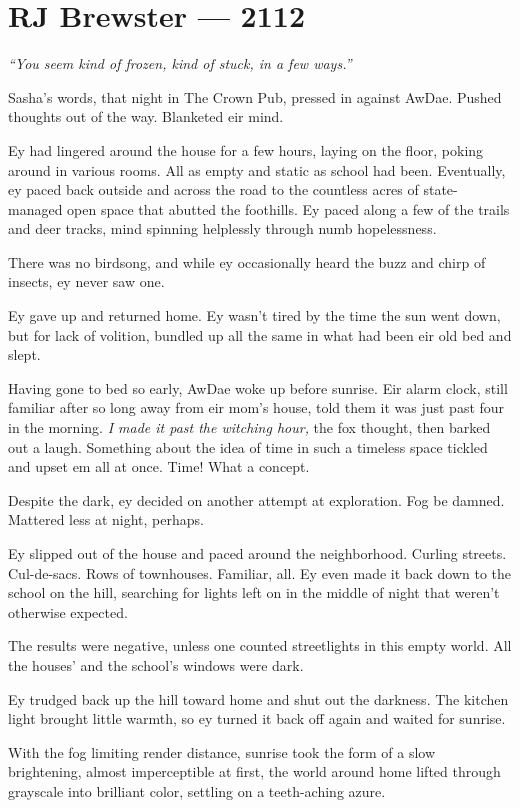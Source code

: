 \hypertarget{rj-brewster-2112}{%
\chapter*{RJ Brewster — 2112}\label{rj-brewster-2112}}

\emph{``You seem kind of frozen, kind of stuck, in a few ways.''}

Sasha's words, that night in The Crown Pub, pressed in against AwDae. Pushed thoughts out of the way. Blanketed eir mind.

Ey had lingered around the house for a few hours, laying on the floor, poking around in various rooms. All as empty and static as school had been. Eventually, ey paced back outside and across the road to the countless acres of state-managed open space that abutted the foothills. Ey paced along a few of the trails and deer tracks, mind spinning helplessly through numb hopelessness.

There was no birdsong, and while ey occasionally heard the buzz and chirp of insects, ey never saw one.

Ey gave up and returned home. Ey wasn't tired by the time the sun went down, but for lack of volition, bundled up all the same in what had been eir old bed and slept.

Having gone to bed so early, AwDae woke up before sunrise. Eir alarm clock, still familiar after so long away from eir mom's house, told them it was just past four in the morning. \emph{I made it past the witching hour,} the fox thought, then barked out a laugh. Something about the idea of time in such a timeless space tickled and upset em all at once. Time! What a concept.

Despite the dark, ey decided on another attempt at exploration. Fog be damned. Mattered less at night, perhaps.

Ey slipped out of the house and paced around the neighborhood. Curling streets. Cul-de-sacs. Rows of townhouses. Familiar, all. Ey even made it back down to the school on the hill, searching for lights left on in the middle of night that weren't otherwise expected.

The results were negative, unless one counted streetlights in this empty world. All the houses' and the school's windows were dark.

Ey trudged back up the hill toward home and shut out the darkness. The kitchen light brought little warmth, so ey turned it back off again and waited for sunrise.

With the fog limiting render distance, sunrise took the form of a slow brightening, almost imperceptible at first, the world around home lifted through grayscale into brilliant color, settling on a teeth-aching azure.

